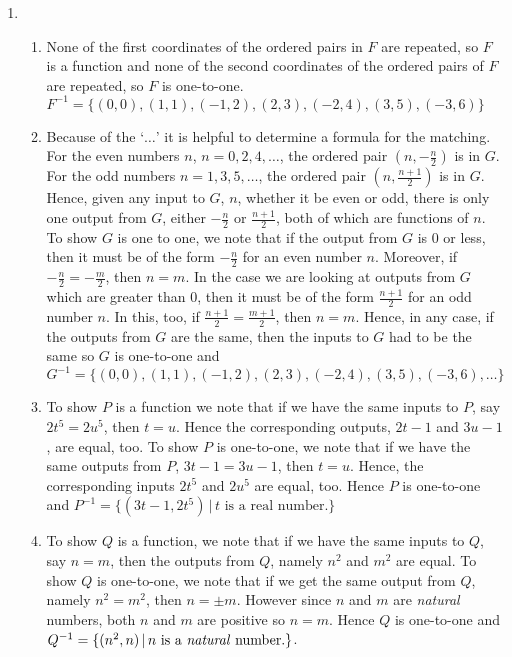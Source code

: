 \begin{enumerate}
\setcounter{enumi}{\value{HW}}

\item

\begin{enumerate}

\item  None of the first coordinates of the ordered pairs in $F$ are repeated, so $F$ is a function and none of the second coordinates of the ordered pairs of $F$ are repeated, so $F$ is one-to-one.   $F^{-1} = \{ (0,0), (1,1), (-1,2), (2,3), (-2,4), (3,5), (-3,6)  \}$

\item  Because of the `$\ldots$' it is helpful to determine a formula for the matching. For the even numbers $n$, $n = 0, 2, 4, \ldots$, the ordered pair $\left(n, -\frac{n}{2} \right)$ is in $G$.  For the odd numbers  $n = 1, 3, 5, \ldots$, the ordered pair $\left(n, \frac{n+1}{2} \right)$ is in $G$.  Hence, given any input to $G$, $n$, whether it be even or odd, there is only one output from $G$, either $-\frac{n}{2}$ or $\frac{n+1}{2}$, both of which are functions of $n$. To show $G$ is one to one, we note that if the output from $G$ is $0$ or less, then it must be of the form $-\frac{n}{2}$ for an even number $n$.  Moreover, if $-\frac{n}{2} = -\frac{m}{2}$, then $n = m$. In the case we are looking at outputs from $G$ which are greater than $0$, then it must be of the form $\frac{n+1}{2}$ for an odd number $n$.  In this, too, if  $\frac{n+1}{2} = \frac{m+1}{2}$, then $n = m$.  Hence, in any case, if the outputs from $G$ are the same, then the inputs to $G$ had to be the same so  $G$ is one-to-one and $G^{-1} = \{ (0,0), (1,1), (-1,2), (2,3), (-2,4), (3,5), (-3,6), \ldots \}$  


\item  To show $P$ is a function we note that if we have the same inputs to $P$, say $2t^{5} = 2u^{5}$, then $t = u$.  Hence the corresponding outputs, $2t-1$ and $3u-1$, are equal, too. To show $P$ is one-to-one, we note that if we have the same outputs from $P$, $3t-1 = 3u-1$, then $t = u$.  Hence, the corresponding  inputs $2t^5$  and $2u^5$ are equal, too. Hence $P$ is one-to-one and $P^{-1} = \{ (3t-1, 2t^5) \, | \, \text{$t$ is a real number.} \}$

\item  To show $Q$ is a function, we note that if we have the same inputs to $Q$, say $n = m$, then the outputs from $Q$, namely $n^2$ and $m^2$ are equal. To show $Q$ is one-to-one, we note that if we get the same output from $Q$, namely $n^2 = m^2$, then $n = \pm m$.  However since $n$ and $m$ are \textit{natural} numbers, both $n$ and $m$ are positive so $n = m$. Hence $Q$ is one-to-one and $Q^{-1} = \{ (n^2, n) \, | \, \text{$n$ is a \textit{natural} number.} \}$.

\end{enumerate}

\setcounter{HW}{\value{enumi}}
\end{enumerate}


